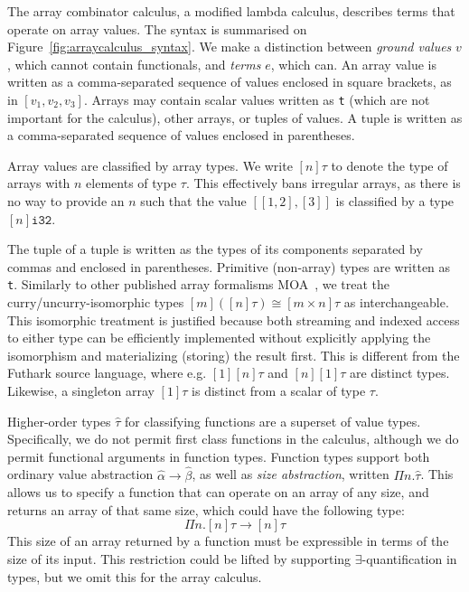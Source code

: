 The array combinator calculus, a modified lambda calculus, describes
terms that operate on array values.  The syntax is summarised on
Figure~\ref{fig:arraycalculus_syntax}.  We make a distinction between
\textit{ground values}
$v$, which cannot contain functionals, and \textit{terms}
$e$, which can.  An array value is written as a comma-separated
sequence of values enclosed in square brackets, as in $[v_{1}, v_{2},
v_{3}]$.  Arrays may contain scalar values written as \texttt{t}
(which are not important for the calculus), other arrays, or tuples of
values.  A tuple is written as a comma-separated sequence of values
enclosed in parentheses.

Array values are classified by array types.  We write $[n]\tau$ to
denote the type of arrays with $n$ elements of type $\tau$.  This
effectively bans irregular arrays, as there is no way to provide an
$n$ such that the value $[[1,2],[3]]$ is classified by a type
$[n]\texttt{i32}$.

The tuple of a tuple is written as the types of its components
separated by commas and enclosed in parentheses.  Primitive
(non-array) types are written as \texttt{t}.  Similarly to other
published array formalisms MOA~\cite{moa}, we treat the
curry/uncurry-isomorphic types $[m]([n]\tau) \cong [m \times n]\tau$
as interchangeable.  This isomorphic treatment is justified because
both streaming and indexed access to either type can be efficiently
implemented without explicitly applying the isomorphism and
materializing (storing) the result first.  This is different from the
Futhark source language, where e.g. $[1][n]\tau$ and $[n][1]\tau$ are
distinct types.  Likewise, a singleton array $[1]\tau$ is distinct
from a scalar of type $\tau$.

Higher-order types $\hat{\tau}$ for classifying functions are a
superset of value types.  Specifically, we do not permit first class
functions in the calculus, although we do permit functional arguments
in function types.  Function types support both ordinary value
abstraction $\hat\alpha\rightarrow\hat\beta$, as well as \textit{size
  abstraction}, written $\Pi n.\hat\tau$.  This allows us to specify a
function that can operate on an array of any size, and returns an
array of that same size, which could have the following type:
\[
  \Pi n.[n]\tau\rightarrow[n]\tau
\]
This size of an array returned by a function must be expressible in
terms of the size of its input.  This restriction could be lifted by
supporting $\exists$-quantification in types, but we omit this for the
array calculus.

